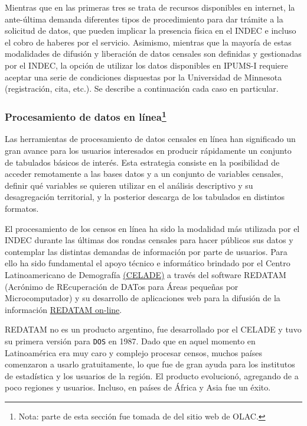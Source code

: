 \documentclass[
]{article}
\begin{document}
Mientras que en las primeras tres se trata de recursos disponibles en internet, la ante-última demanda diferentes tipos de procedimiento para dar trámite a la solicitud de datos, que pueden implicar la presencia física en el INDEC e incluso el cobro de haberes por el servicio. Asimismo, mientras que la mayoría de estas modalidades de difusión y liberación de datos censales son definidas y gestionadas por el INDEC, la opción de utilizar los datos disponibles en IPUMS-I requiere aceptar una serie de condiciones dispuestas por la Universidad de Minnesota (registración, cita, etc.). Se describe a continuación cada caso en particular.

\hypertarget{procesamiento-de-datos-en-luxedneau-2}{%
\subsubsection[Procesamiento de datos en línea]{\texorpdfstring{Procesamiento de datos en línea\footnote{Nota: parte de esta sección fue tomada de del sitio web de OLAC.}}{Procesamiento de datos en línea}}\label{procesamiento-de-datos-en-luxedneau-2}}

Las herramientas de procesamiento de datos censales en línea han significado un gran avance para los usuarios interesados en producir rápidamente un conjunto de tabulados básicos de interés. Esta estrategia consiste en la posibilidad de acceder remotamente a las bases datos y a un conjunto de variables censales, definir qué variables se quieren utilizar en el análisis descriptivo y su desagregación territorial, y la posterior descarga de los tabulados en distintos formatos.

El procesamiento de los censos en línea ha sido la modalidad más utilizada por el INDEC durante las últimas dos rondas censales para hacer públicos sus datos y contemplar las distintas demandas de información por parte de usuarios. Para ello ha sido fundamental el apoyo técnico e informático brindado por el Centro Latinoamericano de Demografía \href{https://www.cepal.org/es/equipo/centro-latinoamericano-caribeno-demografia-celade}{(CELADE)} a través del software REDATAM (Acrónimo de REcuperación de DATos para Áreas pequeñas por Microcomputador) y su desarrollo de aplicaciones web para la difusión de la información \href{https://www.cepal.org/cgi-bin/getprod.asp?xml=/redatam/noticias/paginas/5/14185/P14185.xml\&xsl=/redatam/tpl/p18f.xsl\&base=/redatam/tpl/top-bottom.xsl}{REDATAM on-line}.

REDATAM no es un producto argentino, fue desarrollado por el CELADE y tuvo su primera versión para \texttt{DOS} en 1987. Dado que en aquel momento en Latinoamérica era muy caro y complejo procesar censos, muchos países comenzaron a usarlo gratuitamente, lo que fue de gran ayuda para los institutos de estadística y los usuarios de la región. El producto evolucionó, agregando de a poco regiones y usuarios. Incluso, en países de África y Asia fue un éxito.
\end{document}
